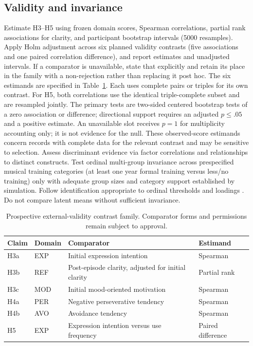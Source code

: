 \subsection{Validity and invariance}
Estimate H3--H5 using frozen domain scores, Spearman correlations, partial rank associations for clarity, and participant bootstrap intervals (5000 resamples). Apply Holm adjustment across six planned validity contrasts (five associations and one paired correlation difference), and report estimates and unadjusted intervals. If a comparator is unavailable, state that explicitly and retain its place in the family with a non-rejection rather than replacing it post hoc. The six estimands are specified in Table~\ref{tab:validity-contrasts}. Each uses complete pairs or triples for its own contrast. For H5, both correlations use the identical triple-complete subset and are resampled jointly. The primary tests are two-sided centered bootstrap tests of a zero association or difference; directional support requires an adjusted $p\leq .05$ and a positive estimate. An unavailable slot receives $p=1$ for multiplicity accounting only; it is not evidence for the null. These observed-score estimands concern records with complete data for the relevant contrast and may be sensitive to selection. Assess discriminant evidence via factor correlations and relationships to distinct constructs. Test ordinal multi-group invariance across prespecified musical training categories (at least one year formal training versus less/no training) only with adequate group sizes and category support established by simulation. Follow identification appropriate to ordinal thresholds and loadings \parencite{wu2016}. Do not compare latent means without sufficient invariance.

\begin{table}[htbp]
\centering\small
\caption{Prospective external-validity contrast family. Comparator forms and permissions remain subject to approval.}
\label{tab:validity-contrasts}
\begin{tabularx}{\linewidth}{l l X l}
\toprule
Claim & Domain & Comparator & Estimand \\
\midrule
H3a & EXP & Initial expression intention & Spearman \\
H3b & REF & Post-episode clarity, adjusted for initial clarity & Partial rank \\
H3c & MOD & Initial mood-oriented motivation & Spearman \\
H4a & PER & Negative perseverative tendency & Spearman \\
H4b & AVO & Avoidance tendency & Spearman \\
H5 & EXP & Expression intention versus use frequency & Paired difference \\
\bottomrule
\end{tabularx}
\end{table}

